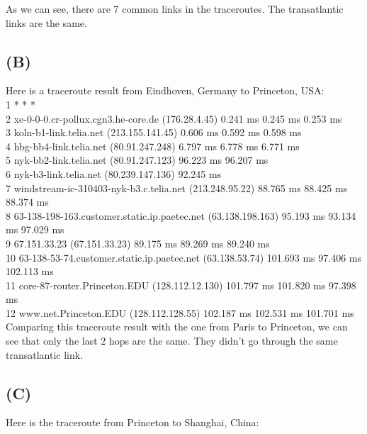 \documentclass[paper=a4, fontsize=11pt]{scrartcl} %
\numberwithin{equation}{section} %
\numberwithin{figure}{section} %
\numberwithin{table}{section} %
\begin{document}
As we can see, there are 7 common links in the traceroutes. The transatlantic links are the same.

\subsection*{(B)}
Here is a traceroute result from Eindhoven, Germany to Princeton, USA: \\

1  * * * \\
2  xe-0-0-0.cr-pollux.cgn3.he-core.de (176.28.4.45)  0.241 ms  0.245 ms  0.253 ms \\
3  koln-b1-link.telia.net (213.155.141.45)  0.606 ms  0.592 ms  0.598 ms \\
4  hbg-bb4-link.telia.net (80.91.247.248)  6.797 ms  6.778 ms  6.771 ms \\
5  nyk-bb2-link.telia.net (80.91.247.123)  96.223 ms  96.207 ms \\
6  nyk-b3-link.telia.net (80.239.147.136)  92.245 ms \\
7  windstream-ic-310403-nyk-b3.c.telia.net (213.248.95.22)  88.765 ms  88.425 ms  88.374 ms \\
8  63-138-198-163.customer.static.ip.paetec.net (63.138.198.163)  95.193 ms  93.134 ms  97.029 ms \\
9  67.151.33.23 (67.151.33.23)  89.175 ms  89.269 ms  89.240 ms \\
10  63-138-53-74.customer.static.ip.paetec.net (63.138.53.74)  101.693 ms  97.406 ms  102.113 ms \\
11  core-87-router.Princeton.EDU (128.112.12.130)  101.797 ms  101.820 ms  97.398 ms \\
12  www.net.Princeton.EDU (128.112.128.55)  102.187 ms  102.531 ms  101.701 ms
\\

Comparing this traceroute result with the one from Paris to Princeton, we can see that only the last 2 hops are the same. They didn't go through the same transatlantic link.

\subsection*{(C)}
Here is the traceroute from Princeton to Shanghai, China: \\
\end{document}
